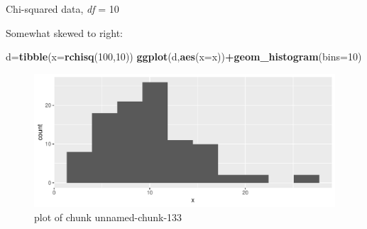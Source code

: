 \documentclass[ignorenonframetext,]{beamer}
\newenvironment{Shaded}{\begin{snugshade}}{\end{snugshade}}
\newcommand{\DataTypeTok}[1]{\textcolor[rgb]{0.13,0.29,0.53}{#1}}
\newcommand{\DecValTok}[1]{\textcolor[rgb]{0.00,0.00,0.81}{#1}}
\newcommand{\KeywordTok}[1]{\textcolor[rgb]{0.13,0.29,0.53}{\textbf{#1}}}
\newcommand{\NormalTok}[1]{#1}
\newcommand{\OperatorTok}[1]{\textcolor[rgb]{0.81,0.36,0.00}{\textbf{#1}}}
\begin{document}
\begin{frame}[fragile]{Chi-squared data, \emph{df} = 10}
\protect\hypertarget{chi-squared-data-df-10}{}

Somewhat skewed to right:

\begin{Shaded}
\begin{Highlighting}[]
\NormalTok{d=}\KeywordTok{tibble}\NormalTok{(}\DataTypeTok{x=}\KeywordTok{rchisq}\NormalTok{(}\DecValTok{100}\NormalTok{,}\DecValTok{10}\NormalTok{))}
\KeywordTok{ggplot}\NormalTok{(d,}\KeywordTok{aes}\NormalTok{(}\DataTypeTok{x=}\NormalTok{x))}\OperatorTok{+}\KeywordTok{geom_histogram}\NormalTok{(}\DataTypeTok{bins=}\DecValTok{10}\NormalTok{)}
\end{Highlighting}
\end{Shaded}

\begin{figure}
\centering
\includegraphics{figure/unnamed-chunk-133-1.pdf}
\caption{plot of chunk unnamed-chunk-133}
\end{figure}

\end{frame}
\end{document}
